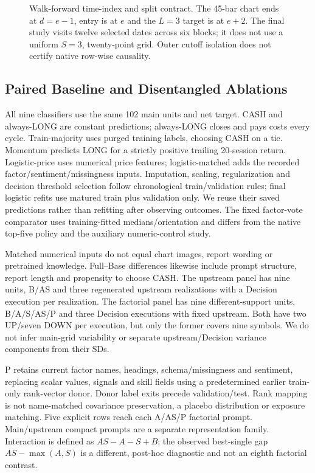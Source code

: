\begin{figure}[!htbp]
\centering
\caption{Walk-forward time-index and split contract. The 45-bar chart ends at $d=e-1$, entry is at $e$ and the $L=3$ target is at $e+2$. The final study visits twelve selected dates across six blocks; it does not use a uniform $S=3$, twenty-point grid. Outer cutoff isolation does not certify native row-wise causality.}
\label{fig:walkforward}
\end{figure}

\subsection{Paired Baseline and Disentangled Ablations}
All nine classifiers use the same 102 main units and net target. CASH and always-LONG are constant predictions; always-LONG closes and pays costs every cycle. Train-majority uses purged training labels, choosing CASH on a tie. Momentum predicts LONG for a strictly positive trailing 20-session return. Logistic-price uses numerical price features; logistic-matched adds the recorded factor/sentiment/missingness inputs. Imputation, scaling, regularization and decision threshold selection follow chronological train/validation rules; final logistic refits use matured train plus validation only. We reuse their saved predictions rather than refitting after observing outcomes. The fixed factor-vote comparator uses training-fitted medians/orientation and differs from the native top-five policy and the auxiliary numeric-control study.

Matched numerical inputs do not equal chart images, report wording or pretrained knowledge. Full--Base differences likewise include prompt structure, report length and propensity to choose CASH. The upstream panel has nine units, B/AS and three regenerated upstream realizations with a Decision execution per realization. The factorial panel has nine different-support units, B/A/S/AS/P and three Decision executions with fixed upstream. Both have two UP/seven DOWN per execution, but only the former covers nine symbols. We do not infer main-grid variability or separate upstream/Decision variance components from their SDs.

P retains current factor names, headings, schema/missingness and sentiment, replacing scalar values, signals and skill fields using a predetermined earlier train-only rank-vector donor. Donor label exits precede validation/test. Rank mapping is not name-matched covariance preservation, a placebo distribution or exposure matching. Five explicit rows reach each A/AS/P factorial prompt. Main/upstream compact prompts are a separate representation family. Interaction is defined as $AS-A-S+B$; the observed best-single gap $AS-\max(A,S)$ is a different, post-hoc diagnostic and not an eighth factorial contrast.

